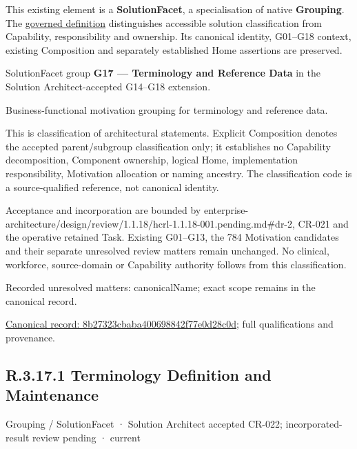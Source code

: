 This existing element is a \textbf{SolutionFacet}, a specialisation of native
\textbf{Grouping}. The \href{\detokenize{../../../../../../../governance/continuum-representation.md#solutionfacet-classification--1119-candidate}}{governed definition}
distinguishes accessible solution classification from Capability, responsibility
and ownership. Its canonical identity, G01–G18 context, existing Composition
and separately established Home assertions are preserved.



SolutionFacet group \textbf{G17 — Terminology and Reference Data} in the Solution Architect-accepted G14–G18 extension.



Business-functional motivation grouping for terminology and reference data.



This is classification of architectural statements. Explicit Composition denotes the accepted parent/subgroup classification only; it establishes no Capability decomposition, Component ownership, logical Home, implementation responsibility, Motivation allocation or naming ancestry. The classification code is a source-qualified reference, not canonical identity.



Acceptance and incorporation are bounded by enterprise-architecture/design/review/1.1.18/hcrl-1.1.18-001.pending.md\#dr-2, CR-021 and the operative retained Task. Existing G01–G13, the 784 Motivation candidates and their separate unresolved review matters remain unchanged. No clinical, workforce, source-domain or Capability authority follows from this classification.


{\small Recorded unresolved matters: canonicalName; exact scope remains in the canonical record.}\par
{\footnotesize \href{../../../../../../../continuum/grouping/8b27323cbaba400698842f77e0d28c0d.md}{Canonical record: 8b27323cbaba400698842f77e0d28c0d}; full qualifications and provenance.}\par
\subsection*{R.3.17.1 Terminology Definition and Maintenance}
\label{navigation:R.3.17.1}

\label{element:b83d63bb553c4642b26bbc41f66445b3}
{\small Grouping / SolutionFacet · Solution Architect accepted CR-022; incorporated-result review pending · current}\par

